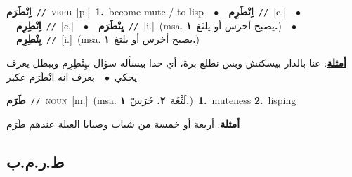 \documentclass[10pt,a4paper,twoside]{article} %
\begin{document}
\begin{multicols}{2}
{\setlength\topsep{0pt}\textbf{\foreignlanguage{arabic}{اِنْطَرَم}}\ {\color{gray}\texttt{//}\color{black}}\ \textsc{verb}\ [p.]\ \textbf{1.}~become mute / to lisp\ \ $\bullet$\ \ \setlength\topsep{0pt}\textbf{\foreignlanguage{arabic}{اِنْطَرِم}}\ {\color{gray}\texttt{//}\color{black}}\ [c.]\ \ $\bullet$\ \ \setlength\topsep{0pt}\textbf{\foreignlanguage{arabic}{اِنْطِرِم}}\ {\color{gray}\texttt{//}\color{black}}\ [c.]\ \ $\bullet$\ \ \setlength\topsep{0pt}\textbf{\foreignlanguage{arabic}{يِنْطَرَم}}\ {\color{gray}\texttt{//}\color{black}}\ [i.]\ \color{gray}(msa. \foreignlanguage{arabic}{يصبح أخرس أو يلثغ}~\foreignlanguage{arabic}{\textbf{١.}})\color{black}\ \ $\bullet$\ \ \setlength\topsep{0pt}\textbf{\foreignlanguage{arabic}{يِنْطِرِم}}\ {\color{gray}\texttt{//}\color{black}}\ [i.]\ \color{gray}(msa. \foreignlanguage{arabic}{يصبح أخرس أو يلثغ}~\foreignlanguage{arabic}{\textbf{١.}})\color{black}\  \begin{flushright}\color{gray}\foreignlanguage{arabic}{\textbf{\underline{\foreignlanguage{arabic}{أمثلة}}}: عنا بالدار بيسكتش وبس نطلع برة، أي حدا بيسأله سؤال بيِنْطِرِم وببطل يعرف يحكي\ $\bullet$\ \  بعرف انه انْطَرَم عكبر}\end{flushright}\color{black}} \vspace{2mm}

{\setlength\topsep{0pt}\textbf{\foreignlanguage{arabic}{طَرَم}}\ {\color{gray}\texttt{//}\color{black}}\ \textsc{noun}\ [m.]\ \color{gray}(msa. \foreignlanguage{arabic}{لَثْغَة}~\foreignlanguage{arabic}{\textbf{٢.}}  \foreignlanguage{arabic}{خَرَسْ}~\foreignlanguage{arabic}{\textbf{١.}})\color{black}\ \textbf{1.}~muteness  \textbf{2.}~lisping\  \begin{flushright}\color{gray}\foreignlanguage{arabic}{\textbf{\underline{\foreignlanguage{arabic}{أمثلة}}}: أربعة أو خمسة من شباب وصبابا العيلة عندهم طَرَم}\end{flushright}\color{black}} \vspace{2mm}

\vspace{-3mm}
\subsection*{\color{blue}\foreignlanguage{arabic}{ط.ر.م.ب}\color{blue}{ (ntws)}} 


\end{multicols}
\end{document}
